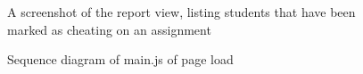 \documentclass[11pt,a4paper]{article}
\begin{document}
\begin{figure}[H]
  \caption{A screenshot of the report view, listing students that have been
  marked as cheating on an assignment}
  \label{fig:reportview}
\end{figure}

\begin{figure}[H]
  \caption{Sequence diagram of main.js of page load}
  \label{fig:uisequence}
\end{figure}
\end{document}
